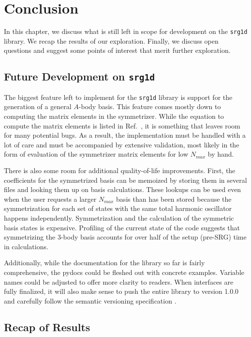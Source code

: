 \chapter{Conclusion}\label{conclusion}

In this chapter, we discuss what is still left in scope for development on the \texttt{srg1d} library. We recap the results of our exploration. Finally, we discuss open questions and suggest some points of interest that merit further exploration.

\section{Future Development on \texttt{srg1d}}

The biggest feature left to implement for the \texttt{srg1d} library is support for the generation of a general $A$-body basis. This feature comes mostly down to computing the matrix elements in the symmetrizer. While the equation to compute the matrix elements is listed in Ref.~\cite{Jurgenson:2008jp}, it is something that leaves room for many potential bugs. As a result, the implementation must be handled with a lot of care and must be accompanied by extensive validation, most likely in the form of evaluation of the symmetrizer matrix elements for low $N_{max}$ by hand.

There is also some room for additional quality-of-life improvements. First, the coefficients for the symmetrized basis can be memoized by storing them in several files and looking them up on basis calculations. These lookups can be used even when the user requests a larger $N_{max}$ basis than has been stored because the symmetrization for each set of states with the same total harmonic oscillator happens independently. Symmetrization and the calculation of the symmetric basis states is expensive. Profiling of the current state of the code suggests that symmetrizing the 3-body basis accounts for over half of the setup (pre-SRG) time in calculations.

Additionally, while the documentation for the library so far is fairly comprehensive, the pydocs could be fleshed out with concrete examples. Variable names could be adjusted to offer more clarity to readers. When interfaces are fully finalized, it will also make sense to push the entire library to version 1.0.0 and carefully follow the semantic versioning specification \cite{semver}.

\section{Recap of Results}

